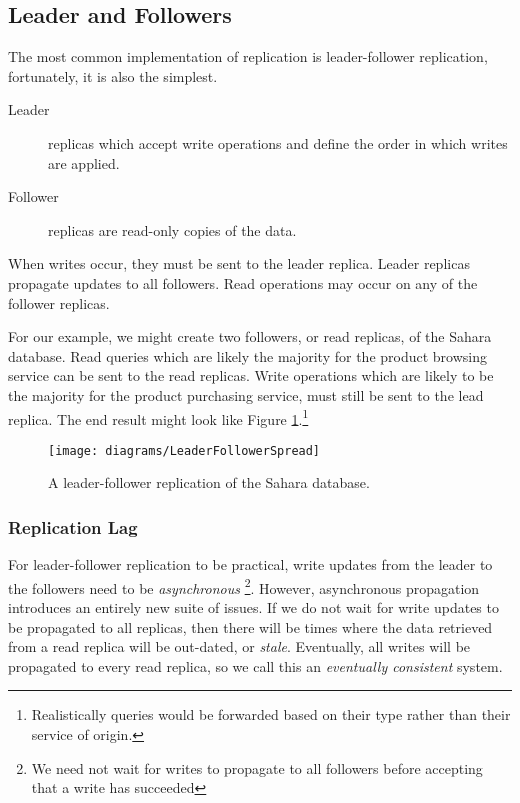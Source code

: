 \subsection{Leader and Followers}
The most common implementation of replication is leader-follower replication,
fortunately, it is also the simplest.

\begin{description}
    \item[Leader] replicas which accept write operations and define the order in which writes are applied.
    \item[Follower] replicas are read-only copies of the data. 
\end{description}

\noindent
When writes occur, they must be sent to the leader replica.
Leader replicas propagate updates to all followers.
Read operations may occur on any of the follower replicas.

For our example,
we might create two followers, or read replicas,
of the Sahara database.
Read queries which are likely the majority for the product browsing service can be sent to the read replicas.
Write operations which are likely to be the majority for the product purchasing service,
must still be sent to the lead replica.
The end result might look like Figure \ref{fig:sahara-leader-follower}.\footnote{Realistically queries would be forwarded based on their type rather than their service of origin.}

\begin{figure}[H]
    \begin{center}
    \texttt{[image: diagrams/LeaderFollowerSpread]}
    \end{center}
    \caption{A leader-follower replication of the Sahara database.}
    \label{fig:sahara-leader-follower}
\end{figure}

\subsubsection*{Replication Lag}

For leader-follower replication to be practical,
write updates from the leader to the followers need to be \textsl{asynchronous}%
\footnote{We need not wait for writes to propagate to all followers before accepting that a write has succeeded}.
However, asynchronous propagation introduces an entirely new suite of issues.
If we do not wait for write updates to be propagated to all replicas,
then there will be times where the data retrieved from a read replica will be out-dated, or \textsl{stale}.
Eventually, all writes will be propagated to every read replica,
so we call this an \textsl{eventually consistent} system.

